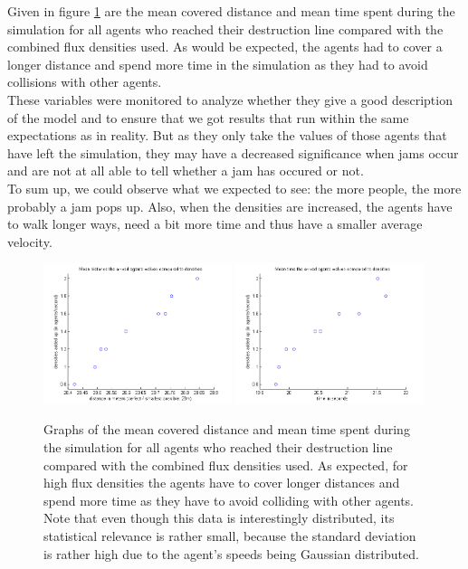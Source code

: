 \noi Given in figure \ref{fig:ACompared} are the mean covered distance and mean time spent during the simulation for all agents who reached their destruction line compared with the combined flux densities used. As would be expected, the agents had to cover a longer distance and spend more time in the simulation as they had to avoid collisions with other agents.\\
These variables were monitored to analyze whether they give a good description of the model and to ensure that we got results that run within the same expectations as in reality. But as they only take the values of those agents that have left the simulation, they may have a decreased significance when jams occur and are not at all able to tell whether a jam has occured or not.\\

\noi To sum up, we could observe what we expected to see: the more people, the more probably a jam pops up. Also, when the densities are increased, the agents have to walk longer ways, need a bit more time and thus have a smaller average velocity.

\pagebreak
\begin{figure}[h!]
	\centering
		\includegraphics[width=0.49\textwidth]{pictures/AMeanDistancesCompared.png}
		\includegraphics[width=0.49\textwidth]{pictures/AMeanTimeCompared.png}
	\caption{Graphs of the mean covered distance and mean time spent during the simulation for all agents who reached their destruction line compared with the combined flux densities used. As expected, for high flux densities the agents have to cover longer distances and spend more time as they have to avoid colliding with other agents. Note that even though this data is interestingly distributed, its statistical relevance is rather small, because the standard deviation is rather high due to the agent's speeds being Gaussian distributed.}
	\label{fig:ACompared}
\end{figure}
